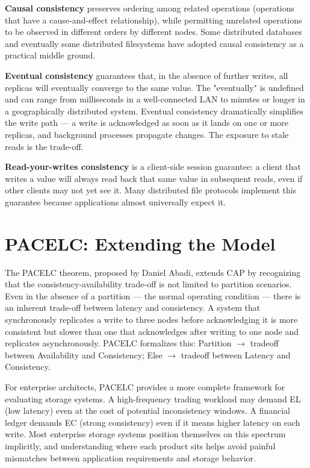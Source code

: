 \textbf{Causal consistency} preserves ordering among related operations (operations that have a cause-and-effect relationship), while permitting unrelated operations to be observed in different orders by different nodes. Some distributed databases and eventually some distributed filesystems have adopted causal consistency as a practical middle ground.

\textbf{Eventual consistency} guarantees that, in the absence of further writes, all replicas will eventually converge to the same value. The "eventually" is undefined and can range from milliseconds in a well-connected LAN to minutes or longer in a geographically distributed system. Eventual consistency dramatically simplifies the write path --- a write is acknowledged as soon as it lands on one or more replicas, and background processes propagate changes. The exposure to stale reads is the trade-off.

\textbf{Read-your-writes consistency} is a client-side session guarantee: a client that writes a value will always read back that same value in subsequent reads, even if other clients may not yet see it. Many distributed file protocols implement this guarantee because applications almost universally expect it.

\section{PACELC: Extending the Model}
The PACELC theorem, proposed by Daniel Abadi, extends CAP by recognizing that the consistency-availability trade-off is not limited to partition scenarios. Even in the absence of a partition --- the normal operating condition --- there is an inherent trade-off between latency and consistency. A system that synchronously replicates a write to three nodes before acknowledging it is more consistent but slower than one that acknowledges after writing to one node and replicates asynchronously. PACELC formalizes this: Partition $\rightarrow$ tradeoff between Availability and Consistency; Else $\rightarrow$ tradeoff between Latency and Consistency.

For enterprise architects, PACELC provides a more complete framework for evaluating storage systems. A high-frequency trading workload may demand EL (low latency) even at the cost of potential inconsistency windows. A financial ledger demands EC (strong consistency) even if it means higher latency on each write. Most enterprise storage systems position themselves on this spectrum implicitly, and understanding where each product sits helps avoid painful mismatches between application requirements and storage behavior.


